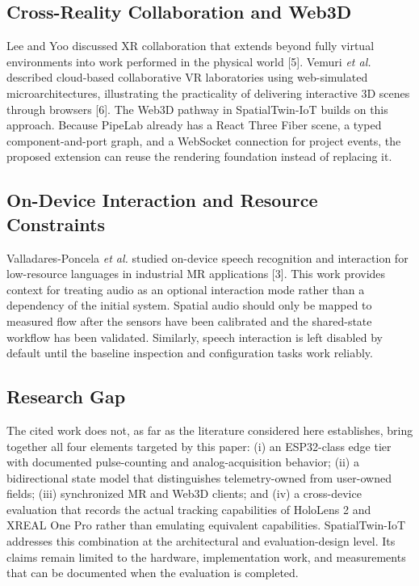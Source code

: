 \documentclass[conference]{IEEEtran}
\begin{document}
\subsection{Cross-Reality Collaboration and Web3D}
Lee and Yoo discussed XR collaboration that extends beyond fully virtual environments into work performed in the physical world [5]. Vemuri \emph{et al.} described cloud-based collaborative VR laboratories using web-simulated microarchitectures, illustrating the practicality of delivering interactive 3D scenes through browsers [6]. The Web3D pathway in SpatialTwin-IoT builds on this approach. Because PipeLab already has a React Three Fiber scene, a typed component-and-port graph, and a WebSocket connection for project events, the proposed extension can reuse the rendering foundation instead of replacing it.

\subsection{On-Device Interaction and Resource Constraints}
Valladares-Poncela \emph{et al.} studied on-device speech recognition and interaction for low-resource languages in industrial MR applications [3]. This work provides context for treating audio as an optional interaction mode rather than a dependency of the initial system. Spatial audio should only be mapped to measured flow after the sensors have been calibrated and the shared-state workflow has been validated. Similarly, speech interaction is left disabled by default until the baseline inspection and configuration tasks work reliably.

\subsection{Research Gap}
The cited work does not, as far as the literature considered here establishes, bring together all four elements targeted by this paper: (i) an ESP32-class edge tier with documented pulse-counting and analog-acquisition behavior; (ii) a bidirectional state model that distinguishes telemetry-owned from user-owned fields; (iii) synchronized MR and Web3D clients; and (iv) a cross-device evaluation that records the actual tracking capabilities of HoloLens 2 and XREAL One Pro rather than emulating equivalent capabilities. SpatialTwin-IoT addresses this combination at the architectural and evaluation-design level. Its claims remain limited to the hardware, implementation work, and measurements that can be documented when the evaluation is completed.
\end{document}
